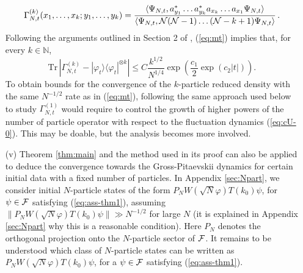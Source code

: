 \documentclass[11pt,a4paper]{article}
\newtheorem{thm}{Theorem}[section]  %
\newcommand{\done}{}
\newcommand{\eps}{\varepsilon}
\newcommand{\bR}{{\mathbb R}}
\newcommand{\bN}{{\mathbb N}}
\newcommand{\tr}{\mbox{Tr}}
\newcommand{\cF}{{\cal F}}
\newcommand{\cH}{{\cal H}}
\newcommand{\cN}{{\cal N}}
\begin{document}
\begin{itemize}
\[ \Gamma_{N,t}^{(k)} (x_1, \dots , x_k ; y_1, \dots, y_k) = \frac{\langle \Psi_{N,t}, a_{y_1}^* \dots a_{y_k}^* a_{x_k} \dots a_{x_1} \Psi_{N,t} \rangle}{\langle \Psi_{N,t} , \cN ( \cN-1) \dots (\cN-k+1) \Psi_{N,t} \rangle} \, .  \]
Following the arguments outlined in Section 2 of \cite{KP2009}, (\ref{eq:mt}) implies that, for every $k \in \bN$,
\[ \tr \, \left| \Gamma^{(k)}_{N,t} - |\varphi_t \rangle \langle \varphi_t|^{\otimes k} \right| \leq C \frac{k^{1/2}}{N^{1/4}} \exp\left(\frac{c_1}{2} \exp (c_2 |t|)\right).\done \]
To obtain bounds for the convergence of the $k$-particle reduced density with the same $N^{-1/2}$ rate as in (\ref{eq:mt}), following the same approach used below to study $\Gamma^{(1)}_{N,t}$ would require to control the growth of higher powers of the number of particle operator with respect to the fluctuation dynamics (\ref{eq:cU-0}). This may be doable, but the analysis becomes more involved. 
\item[(v)] Theorem \ref{thm:main} and the method used in its proof can also be applied to deduce the convergence towards the Gross-Pitaevskii dynamics for certain initial data with a fixed number of particles. In Appendix \ref{sec:Npart}, we consider initial $N$-particle states of the form 
$P_N W(\sqrt{N} \varphi) T(k_0) \psi$, for $\psi \in \cF$ satisfying (\ref{eq:ass-thm1}), assuming 
$\| P_N W(\sqrt{N} \varphi) T(k_0) \psi \| \gg N^{-1/2}$ for large $N$ (it is explained in Appendix \ref{sec:Npart} why this is a reasonable condition). Here $P_N$ denotes the orthogonal projection onto the $N$-particle sector of $\cF$. It remains to be understood which class of $N$-particle states can be written as $P_N W(\sqrt{N} \varphi) T(k_0) \psi$, for a $\psi \in \cF$ satisfying (\ref{eq:ass-thm1}). 
\end{itemize}

\end{document}
